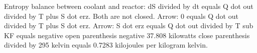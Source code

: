 Entropy balance between coolant and reactor:  
dS divided by dt equals Q dot out divided by T plus S dot erz.  
Both are not closed.  
Arrow: 0 equals Q dot out divided by T plus S dot erz.  
Arrow: S dot erz equals Q dot out divided by T sub KF equals negative open parenthesis negative 37.808 kilowatts close parenthesis divided by 295 kelvin equals 0.7283 kilojoules per kilogram kelvin.